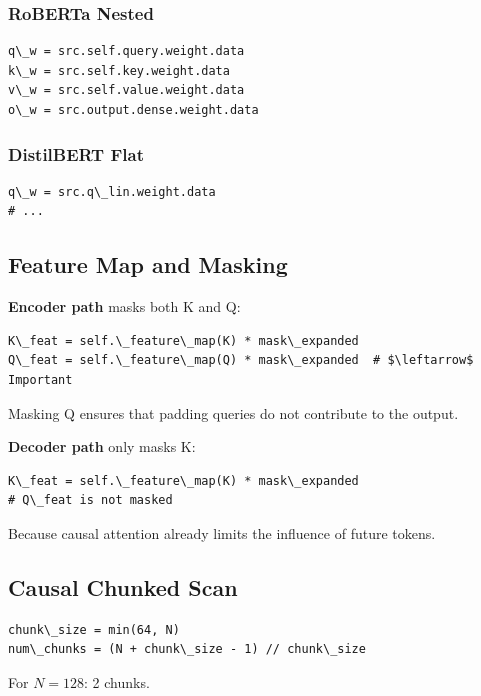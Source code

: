 \subsubsection{RoBERTa Nested}

\begin{lstlisting}
q\_w = src.self.query.weight.data
k\_w = src.self.key.weight.data
v\_w = src.self.value.weight.data
o\_w = src.output.dense.weight.data
\end{lstlisting}

\subsubsection{DistilBERT Flat}

\begin{lstlisting}
q\_w = src.q\_lin.weight.data
# ...
\end{lstlisting}

\subsection{Feature Map and Masking}

\textbf{Encoder path} masks both K and Q:

\begin{lstlisting}
K\_feat = self.\_feature\_map(K) * mask\_expanded
Q\_feat = self.\_feature\_map(Q) * mask\_expanded  # $\leftarrow$ Important
\end{lstlisting}

Masking Q ensures that padding queries do not contribute to the output.

\textbf{Decoder path} only masks K:

\begin{lstlisting}
K\_feat = self.\_feature\_map(K) * mask\_expanded
# Q\_feat is not masked
\end{lstlisting}

Because causal attention already limits the influence of future tokens.

\subsection{Causal Chunked Scan}

\begin{lstlisting}
chunk\_size = min(64, N)
num\_chunks = (N + chunk\_size - 1) // chunk\_size
\end{lstlisting}

For $N = 128$: 2 chunks.


